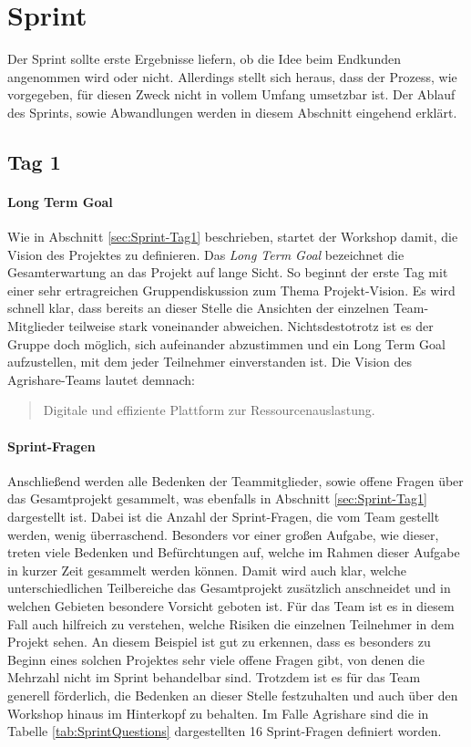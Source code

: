 \section{Sprint}
\label{sec:Sprint-Umsetzung}
Der Sprint sollte erste Ergebnisse liefern, ob die Idee beim Endkunden angenommen wird oder nicht. Allerdings stellt sich heraus, dass der Prozess, wie vorgegeben, für diesen Zweck nicht in vollem Umfang umsetzbar ist. Der Ablauf des Sprints, sowie Abwandlungen werden in diesem Abschnitt eingehend erklärt.
\subsection*{\label{sec:Sprint-Umsetzung-Tag1}\thesubsection\quad Tag 1}
\paragraph{Long Term Goal}
Wie in Abschnitt \ref{sec:Sprint-Tag1} beschrieben, startet der Workshop damit, die Vision des Projektes zu definieren. Das \textit{Long Term Goal} bezeichnet die Gesamterwartung an das Projekt auf lange Sicht. So beginnt der erste Tag mit einer sehr ertragreichen Gruppendiskussion zum Thema Projekt-Vision. Es wird schnell klar, dass bereits an dieser Stelle die Ansichten der einzelnen Team-Mitglieder teilweise stark voneinander abweichen. Nichtsdestotrotz ist es der Gruppe doch möglich, sich aufeinander abzustimmen und ein Long Term Goal aufzustellen, mit dem jeder Teilnehmer einverstanden ist. Die Vision des Agrishare-Teams lautet demnach:
\begin{quote}
Digitale und effiziente Plattform zur Ressourcenauslastung.
\end{quote}
\paragraph{Sprint-Fragen}
Anschließend werden alle Bedenken der Teammitglieder, sowie offene Fragen über das Gesamtprojekt gesammelt, was ebenfalls in Abschnitt \ref{sec:Sprint-Tag1} dargestellt ist. 
Dabei ist die Anzahl der Sprint-Fragen, die vom Team gestellt werden, wenig überraschend. Besonders vor einer großen Aufgabe, wie dieser, treten viele Bedenken und Befürchtungen auf, welche im Rahmen dieser Aufgabe in kurzer Zeit gesammelt werden können. Damit wird auch klar, welche unterschiedlichen Teilbereiche das Gesamtprojekt zusätzlich anschneidet und in welchen Gebieten besondere Vorsicht geboten ist. Für das Team ist es in diesem Fall auch hilfreich zu verstehen, welche Risiken die einzelnen Teilnehmer in dem Projekt sehen. An diesem Beispiel ist gut zu erkennen, dass es besonders zu Beginn eines solchen Projektes sehr viele offene Fragen gibt, von denen die Mehrzahl nicht im Sprint behandelbar sind. Trotzdem ist es für das Team generell förderlich, die Bedenken an dieser Stelle festzuhalten und auch über den Workshop hinaus im Hinterkopf zu behalten. Im Falle Agrishare sind die in Tabelle \ref{tab:SprintQuestions} dargestellten 16 Sprint-Fragen definiert worden.

